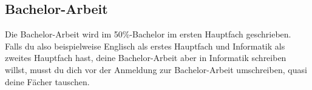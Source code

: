 \subsection{Bachelor-Arbeit}
Die Bachelor-Arbeit wird im 50\%-Bachelor im ersten Hauptfach geschrieben. Falls du also beispielweise Englisch als erstes Hauptfach und Informatik als zweites Hauptfach hast, deine Bachelor-Arbeit aber in Informatik schreiben willst, musst du dich vor der Anmeldung zur Bachelor-Arbeit umschreiben, quasi deine Fächer tauschen. 
